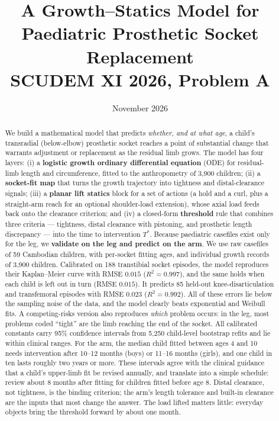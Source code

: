 \documentclass[11pt]{article}
\title{\textbf{A Growth--Statics Model for Paediatric Prosthetic Socket Replacement}\\[4pt]
\large SCUDEM XI 2026, Problem A}
\author{\teamname}
\date{November 2026}
\theoremstyle{definition}
\begin{document}
\maketitle

\begin{abstract}
We build a mathematical model that predicts \emph{whether, and at what age}, a child's transradial (below-elbow) prosthetic socket reaches a point of substantial change that warrants adjustment or replacement as the residual limb grows. The model has four layers: (i) a \textbf{logistic growth ordinary differential equation} (ODE) for residual-limb length and circumference, fitted to the anthropometry of 3,900 children; (ii) a \textbf{socket-fit map} that turns the growth trajectory into tightness and distal-clearance signals; (iii) a \textbf{planar lift statics} block for a set of actions (a hold and a curl, plus a straight-arm reach for an optional shoulder-load extension), whose axial load feeds back onto the clearance criterion; and (iv) a closed-form \textbf{threshold} rule that combines three criteria --- tightness, distal clearance with pistoning, and prosthetic length discrepancy --- into the time to intervention $T^*$. Because paediatric casefiles exist only for the leg, we \textbf{validate on the leg and predict on the arm}. We use raw casefiles of 59 Cambodian children, with per-socket fitting ages, and individual growth records of 3,900 children. Calibrated on 188 transtibial socket episodes, the model reproduces their Kaplan--Meier curve with RMSE $0.015$ ($R^2=0.997$), and the same holds when each child is left out in turn (RMSE $0.015$). It predicts 85 held-out knee-disarticulation and transfemoral episodes with RMSE $0.023$ ($R^2=0.992$). All of these errors lie below the sampling noise of the data, and the model clearly beats exponential and Weibull fits. A competing-risks version also reproduces \emph{which} problem occurs: in the leg, most problems coded ``tight'' are the limb reaching the end of the socket. All calibrated constants carry 95\% confidence intervals from 5,250 child-level bootstrap refits and lie within clinical ranges. For the arm, the median child fitted between ages 4 and 10 needs intervention after 10--12 months (boys) or 11--16 months (girls), and one child in ten lasts roughly two years or more. These intervals agree with the clinical guidance that a child's upper-limb fit be revised annually, and translate into a simple schedule: review about 8 months after fitting for children fitted before age 8. Distal clearance, not tightness, is the binding criterion; the arm's length tolerance and built-in clearance are the inputs that most change the answer. The load lifted matters little: everyday objects bring the threshold forward by about one month.
\end{abstract}
\end{document}
